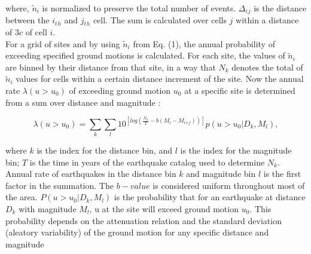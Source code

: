 \noindent
where,  $\tilde{n}_i$  is normalized to preserve the total number of events. $\Delta{_i{_j}}$ is the distance between the $i{_t{_h}}$ and $j{_t{_h}}$ cell. The sum is calculated over cells $j$ within a distance of $3c$ of cell $i$.\\
\noindent
For a grid of sites and by using $\tilde{n}_i$ from Eq. (1), the annual probability of exceeding specified ground motions is calculated. For each site, the values of $\tilde{n}_i$ are binned by their distance from that site, in a way that $N_k$ denotes the total of $\tilde{n}_i$ values for cells within a certain distance increment of the site. Now the annual rate $\lambda (u> u_0 )$ of exceeding ground motion $u_0$ at a specific site is determined from a sum over distance and magnitude \citet{Frankel1995}:



\begin{equation}
\lambda(u>u_{0}) = \sum_{k}\sum_{l}10^{[log(\frac{N_{k}}{T}-b(M_l-M{_r{_e{_f}}}))]} p(u>u_0 | D_k ,M_l),
\end{equation}

\noindent
where $k$ is the index for the distance bin, and $l$ is the index for the magnitude bin; $T$ is the time in years of the earthquake catalog used to determine $N_k$. Annual rate of earthquakes in the distance bin $k$ and magnitude bin $l$ is the first factor in the summation. The $b-value$ is considered uniform throughout most of the area. $P(u>u_0 | D_k,M_l )$ is the probability that for an earthquake at distance $D_k$ with magnitude $M_l$, u at the site will exceed  ground motion $u_0$. This probability depends on the attenuation relation and the standard deviation (aleatory variability) of the ground motion for any specific distance and magnitude \citep{Frankel1995}


